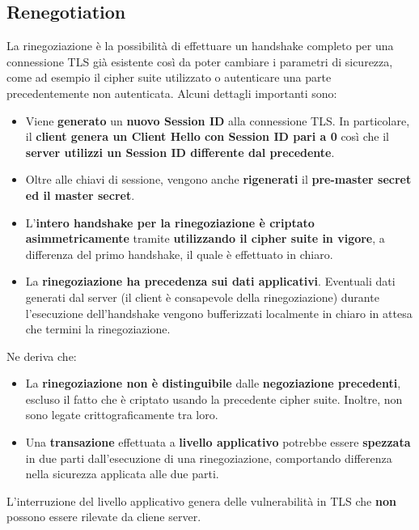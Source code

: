 \subsection{Renegotiation}
La rinegoziazione è la possibilità di effettuare un handshake completo per una connessione TLS già esistente così da poter cambiare i parametri di sicurezza, come ad esempio il cipher suite utilizzato o autenticare una parte precedentemente non autenticata. Alcuni dettagli importanti sono:
\begin{definition}\label{def:renegotiation}
\begin{itemize}
    \item Viene \textbf{generato} un \textbf{nuovo Session ID} alla connessione TLS. In particolare, il \textbf{client genera un Client Hello con Session ID pari a 0} così che il \textbf{server utilizzi un Session ID differente dal precedente}.
    \item Oltre alle chiavi di sessione, vengono anche \textbf{rigenerati} il \textbf{pre-master secret ed il master secret}.
    \item L’\textbf{intero handshake per la rinegoziazione è criptato asimmetricamente} tramite \textbf{utilizzando il cipher suite in vigore}, a differenza del primo handshake, il quale è effettuato in chiaro.
    \item La\textbf{ rinegoziazione ha precedenza sui dati applicativi}. Eventuali dati generati dal server (il client è consapevole della rinegoziazione) durante l’esecuzione dell’handshake vengono bufferizzati localmente in chiaro in attesa che termini la rinegoziazione.
\end{itemize}
\end{definition}
Ne deriva che:
\begin{itemize}
    \item La \textbf{rinegoziazione non è distinguibile} dalle \textbf{negoziazione precedenti}, escluso il fatto che è criptato usando la precedente cipher suite. Inoltre, non sono legate crittograficamente tra loro.
    \item Una \textbf{transazione} effettuata a \textbf{livello applicativo} potrebbe essere \textbf{spezzata} in due parti dall'esecuzione di una rinegoziazione, comportando differenza nella sicurezza applicata alle due parti.
\end{itemize}
\begin{note}
L'interruzione del livello applicativo genera delle vulnerabilità in TLS che \textbf{non} possono essere rilevate da cliene server.
\end{note}
\pagebreak
